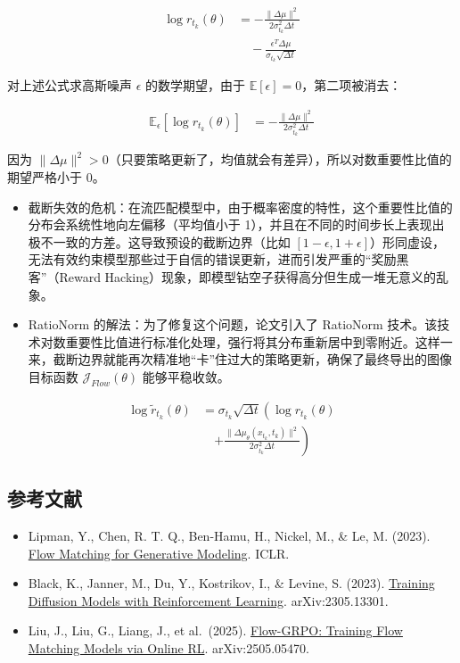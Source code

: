 \[
\begin{aligned}
\log r_{t_k}(\theta)
&=
-\frac{\|\Delta\mu\|^2}{2\sigma_{t_k}^2\Delta t}
\\
&\quad-
\frac{\epsilon^T\Delta\mu}{\sigma_{t_k}\sqrt{\Delta t}}
\end{aligned}
\]

对上述公式求高斯噪声 \(\epsilon\) 的数学期望，由于 \(\mathbb{E}[\epsilon]=0\)，第二项被消去：

\[
\begin{aligned}
\mathbb{E}_{\epsilon}\left[\log r_{t_k}(\theta)\right]
&=
-\frac{\|\Delta\mu\|^2}{2\sigma_{t_k}^2\Delta t}
\end{aligned}
\]

因为 \(\|\Delta\mu\|^2>0\)（只要策略更新了，均值就会有差异），所以对数重要性比值的期望严格小于 0。

\begin{itemize}
\item
  截断失效的危机：在流匹配模型中，由于概率密度的特性，这个重要性比值的分布会系统性地向左偏移（平均值小于 1），并且在不同的时间步长上表现出极不一致的方差。这导致预设的截断边界（比如 \([1-\epsilon,1+\epsilon]\)）形同虚设，无法有效约束模型那些过于自信的错误更新，进而引发严重的``奖励黑客''（Reward Hacking）现象，即模型钻空子获得高分但生成一堆无意义的乱象。
\item
  RatioNorm 的解法：为了修复这个问题，论文引入了 RatioNorm 技术。该技术对数重要性比值进行标准化处理，强行将其分布重新居中到零附近。这样一来，截断边界就能再次精准地``卡''住过大的策略更新，确保了最终导出的图像目标函数 \(\mathcal{J}_{Flow}(\theta)\) 能够平稳收敛。
\end{itemize}

\[
\begin{aligned}
\log \tilde{r}_{t_k}(\theta)
&=
\sigma_{t_k}\sqrt{\Delta t}
\left(
\log r_{t_k}(\theta)
\right.
\\
&\quad\left.
+\frac{\|\Delta\mu_\theta(x_{t_k},t_k)\|^2}{2\sigma_{t_k}^2\Delta t}
\right)
\end{aligned}
\]

\FloatBarrier
{}
\hypertarget{ux53c2ux8003ux6587ux732e-137}{%
\subsection{参考文献}\label{ux53c2ux8003ux6587ux732e-137}}

\vspace{0.25em}
\begin{itemize}
\tightlist
\item
  Lipman, Y., Chen, R. T. Q., Ben-Hamu, H., Nickel, M., \& Le, M. (2023). \href{https://arxiv.org/abs/2210.02747}{Flow Matching for Generative Modeling}. ICLR.
\item
  Black, K., Janner, M., Du, Y., Kostrikov, I., \& Levine, S. (2023). \href{https://arxiv.org/abs/2305.13301}{Training Diffusion Models with Reinforcement Learning}. arXiv:2305.13301.
\item
  Liu, J., Liu, G., Liang, J., et al.~(2025). \href{https://arxiv.org/abs/2505.05470}{Flow-GRPO: Training Flow Matching Models via Online RL}. arXiv:2505.05470.
\end{itemize}

\clearpage
